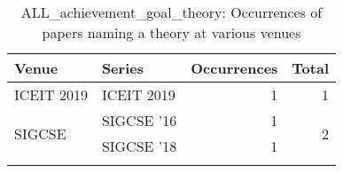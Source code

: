 \begin{table*}[t]
\begin{tabular}{llrr}
Venue & Series & Occurrences & Total\\\hline
\multirow{1}{*}{ICEIT 2019} & ICEIT 2019 & 1 & \multirow{1}{*}{1}\\
\multirow{2}{*}{SIGCSE } & SIGCSE '16 & 1 & \multirow{2}{*}{2}\\
& SIGCSE '18 & 1 &\\
\caption{ALL_achievement_goal_theory: Occurrences of papers naming a theory at various venues}
\end{tabular}
\end{table*}
